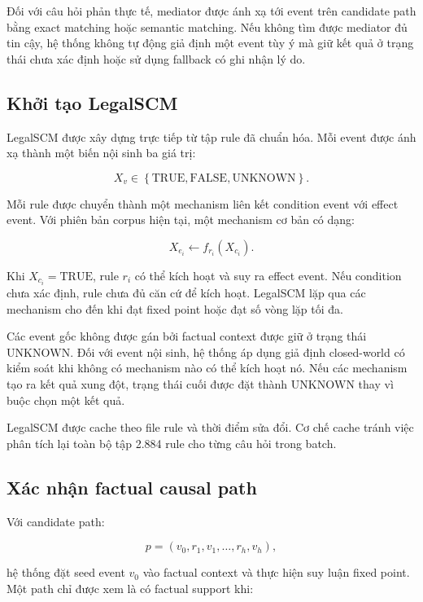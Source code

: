 Đối với câu hỏi phản thực tế, mediator được ánh xạ tới event trên candidate
path bằng exact matching hoặc semantic matching. Nếu không tìm được mediator
đủ tin cậy, hệ thống không tự động giả định một event tùy ý mà giữ kết quả ở
trạng thái chưa xác định hoặc sử dụng fallback có ghi nhận lý do.

\subsection{Khởi tạo LegalSCM}

LegalSCM được xây dựng trực tiếp từ tập rule đã chuẩn hóa. Mỗi event được ánh
xạ thành một biến nội sinh ba giá trị:

\[
X_v
\in
\left\{
    \mathrm{TRUE},
    \mathrm{FALSE},
    \mathrm{UNKNOWN}
\right\}.
\]

Mỗi rule được chuyển thành một mechanism liên kết condition event với effect
event. Với phiên bản corpus hiện tại, một mechanism cơ bản có dạng:

\begin{equation}
X_{e_i}
\leftarrow
f_{r_i}
\left(
    X_{c_i}
\right).
\end{equation}

Khi \(X_{c_i}=\mathrm{TRUE}\), rule \(r_i\) có thể kích hoạt và suy ra effect
event. Nếu condition chưa xác định, rule chưa đủ căn cứ để kích hoạt.
LegalSCM lặp qua các mechanism cho đến khi đạt fixed point hoặc đạt số vòng
lặp tối đa.

Các event gốc không được gán bởi factual context được giữ ở trạng thái
\(\mathrm{UNKNOWN}\). Đối với event nội sinh, hệ thống áp dụng giả định
closed-world có kiểm soát khi không có mechanism nào có thể kích hoạt nó.
Nếu các mechanism tạo ra kết quả xung đột, trạng thái cuối được đặt thành
\(\mathrm{UNKNOWN}\) thay vì buộc chọn một kết quả.

LegalSCM được cache theo file rule và thời điểm sửa đổi. Cơ chế cache tránh
việc phân tích lại toàn bộ tập 2.884 rule cho từng câu hỏi trong batch.

\subsection{Xác nhận factual causal path}

Với candidate path:

\[
p=
\left(
v_0,r_1,v_1,\ldots,r_h,v_h
\right),
\]

hệ thống đặt seed event \(v_0\) vào factual context và thực hiện suy luận
fixed point. Một path chỉ được xem là có factual support khi:

